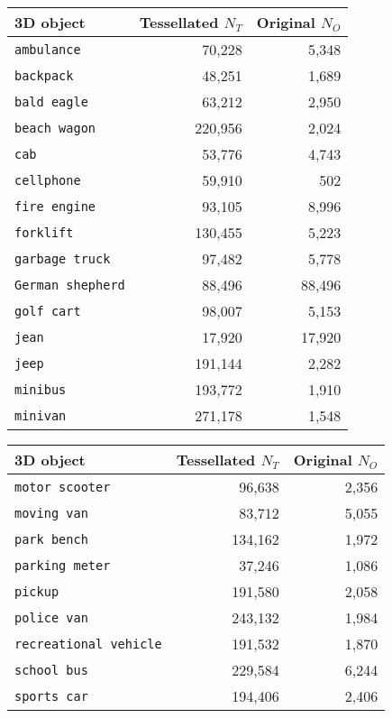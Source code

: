 \documentclass[10pt,twocolumn,letterpaper]{article}
\newcommand{\class}[1]{{\small\texttt{#1}}}
\begin{document}
  \begin{table}[h]
	\centering
	\begin{tabular}{lrr}
		\toprule
		3D object        & Tessellated \(N_T\) & Original \(N_O\) \\
		\midrule
		\class{ambulance}            & 70,228 & 5,348 \\
		\class{backpack}             & 48,251 & 1,689\\
		\class{bald eagle}           & 63,212 & 2,950\\
		\class{beach wagon}          & 220,956 & 2,024\\
		\class{cab}                  & 53,776 & 4,743\\
		\class{cellphone}   & 59,910 & 502\\
		\class{fire engine}          & 93,105 & 8,996\\
		\class{forklift}             & 130,455 & 5,223\\
		\class{garbage truck}        & 97,482 & 5,778\\
		\class{German shepherd}      & 88,496 & 88,496\\
		\class{golf cart}            & 98,007 & 5,153\\
		\class{jean}                 & 17,920 & 17,920\\
		\class{jeep}                 & 191,144 & 2,282\\
		\class{minibus}              & 193,772 & 1,910\\
		\class{minivan}              & 271,178 & 1,548\\
		\bottomrule
	\end{tabular}
	\begin{tabular}{lrr}
		\toprule
		3D object        & Tessellated \(N_T\) & Original \(N_O\) \\
		\midrule
		\class{motor scooter}        & 96,638 & 2,356\\
		\class{moving van}           & 83,712 & 5,055\\
		\class{park bench}           & 134,162 & 1,972\\
		\class{parking meter}        & 37,246 & 1,086\\
		\class{pickup}               & 191,580 & 2,058\\
		\class{police van}           & 243,132 & 1,984\\
		\class{recreational vehicle} & 191,532 & 1,870\\
		\class{school bus}           & 229,584 & 6,244\\
		\class{sports car}           & 194,406 & 2,406\\

\end{tabular}
\end{table}
\end{document}
